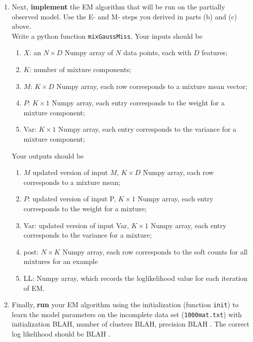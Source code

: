 \begin{enumerate}
\begin{enumerate}
\item Next, \textbf{implement} the EM algorithm that will be run on the partially observed model. Use the E- and M- steps you derived in parts (b) and (c) above.\\
    Write a python function \texttt{mixGaussMiss}. Your inputs should be
    \begin{enumerate}
    \item $X$: an $N \times D$ Numpy array of $N$ data points, each with $D$ features;
    \item $K$: number of mixture components;
    \item $M$: $K \times D$ Numpy array, each row corresponds to a mixture mean vector;
    \item $P$: $K \times 1$ Numpy array, each entry corresponds to the weight for a mixture component;
    \item Var: $K \times 1$ Numpy array, each entry corresponds to the variance for a mixture component;
    \end{enumerate}
    Your outputs should be
    \begin{enumerate}
    \item $M$ updated version of input $M$, $K \times D$ Numpy array, each row corresponds to a mixture mean;
    \item $P$: updated version of input P, $K \times 1$ Numpy array, each entry corresponds to the weight for a mixture;
    \item Var: updated version of input Var, $K \times 1$ Numpy array, each entry corresponds to the variance for a mixture;
    \item post: $N \times K$ Numpy array, each row corresponds to the soft counts for all mixtures for an example
    \item LL: Numpy array, which records the loglikelihood value for each iteration of EM.
    \end{enumerate}
    
\item Finally, \textbf{run} your EM algorithm using the initialization (function \texttt{init}) to learn the model parameters on the incomplete data set (\texttt{1000mat.txt}) with initialization BLAH, number of clusters BLAH, precision BLAH  . The correct log likelihood should be BLAH . 


\end{enumerate}
\end{enumerate}
